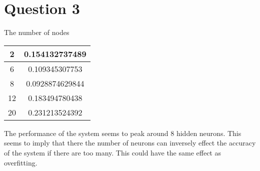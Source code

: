 \documentclass[12pt,a4paper]{article}
\begin{document}
\section*{Question 3}
\label{sec:question_3}
The number of nodes

\begin{tabular}{|c|c|}
\hline
2 & 0.154132737489\\
\hline
6 & 0.109345307753\\
\hline
8 & 0.0928874629844\\
\hline
12 & 0.183494780438\\
\hline
20 & 0.231213524392\\
\hline
\end{tabular}

The performance of the system seems to peak around 8 hidden neurons. This seems to imply that there the number of neurons can inversely effect the accuracy of the system if there are too many. This could have the same effect as overfitting.
\end{document}
